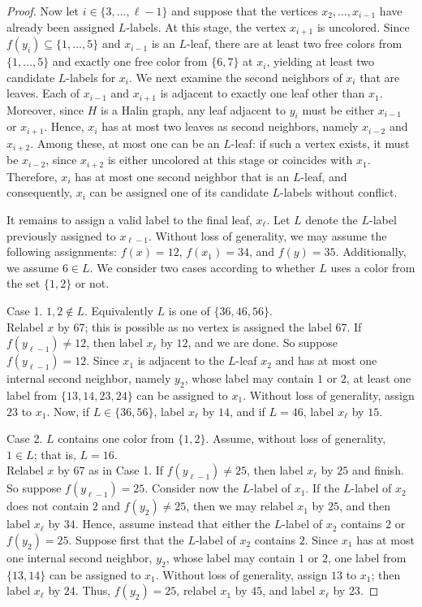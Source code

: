 \documentclass[12pt]{article}
\numberwithin{theorem}{section}
\numberwithin{conjecture}{section}
\numberwithin{corollary}{section}
\numberwithin{example}{section}
\numberwithin{lemma}{section}
\numberwithin{proposition}{section}
\numberwithin{problem}{section}
\numberwithin{remark}{section}
\numberwithin{claim}{theorem}
\numberwithin{definition}{section}
\begin{document}
\begin{proof}
\noindent Now let $i \in \{3,\dots,\ell-1\}$ and suppose that the vertices
$x_2,\dots,x_{i-1}$ have already been assigned $L$-labels. At this stage, the vertex $x_{i+1}$ is uncolored. Since $f(y_i) \subseteq \{1,\dots,5\}$ and $x_{i-1}$ is an $L$-leaf, there are at least two free colors from $\{1,\dots,5\}$ and exactly one free color from $\{6,7\}$ at $x_i$, yielding at least two candidate $L$-labels for $x_i$. We next examine the second neighbors of $x_i$ that are leaves. Each of $x_{i-1}$ and $x_{i+1}$ is adjacent to exactly one leaf other than $x_1$. Moreover, since $H$ is a Halin graph, any leaf adjacent to $y_i$ must be either $x_{i-1}$ or $x_{i+1}$. Hence, $x_i$ has at most two leaves as second neighbors, namely $x_{i-2}$ and $x_{i+2}$. Among these, at most one can be an $L$-leaf: if such a vertex exists, it must be $x_{i-2}$, since $x_{i+2}$ is either uncolored at this stage or coincides with $x_1$. Therefore, $x_i$ has at most one second neighbor that is an $L$-leaf, and consequently, $x_i$ can be assigned one of its candidate $L$-labels without conflict.

\noindent It remains to assign a valid label to the final leaf, $x_\ell$. Let $L$ denote the $L$-label previously assigned to $x_{\ell-1}$. Without loss of generality, we may assume the following assignments: $f(x) = 12$, $f(x_1) = 34$, and $f(y) = 35$. Additionally, we assume $6 \in L$. We consider two cases according to whether $L$ uses a color from the set $\{1,2\}$ or not.

\noindent Case 1. $1,2\notin L$. Equivalently $L$ is one of $\{36,46,56\}$.\\
\noindent Relabel $x$ by $67$; this is possible as no vertex is assigned the label 67. If $f(y_{\ell-1})\neq 12$, then label $x_\ell$ by $12$, and we are done. So suppose $f(y_{\ell-1})=12$. Since $x_1$ is adjacent to the $L$-leaf $x_2$ and has at most one internal second neighbor, namely $y_2$, whose label may contain $1$ or $2$, at least one label from $\{13,14,23,24\}$ can be assigned to $x_1$. Without loss of generality, assign $23$ to $x_1$. Now, if $L\in\{36,56\}$, label $x_\ell$ by $14$, and if $L=46$, label $x_\ell$ by $15$.

\noindent Case 2. $L$ contains one color from $\{1,2\}$. Assume, without loss of generality, $1\in L$; that is, $L=16$.\\
\noindent Relabel $x$ by $67$ as in Case 1. If $f(y_{\ell-1})\neq 25$, then label $x_\ell$ by $25$ and finish. So suppose $f(y_{\ell-1})=25$. Consider now the $L$-label of $x_1$. If the $L$-label of $x_2$ does not contain $2$ and $f(y_2)\neq 25$, then we may relabel $x_1$ by $25$, and then label $x_\ell$ by $34$. Hence, assume instead that either the $L$-label of $x_2$ contains $2$ or $f(y_2)=25$. Suppose first that the $L$-label of $x_2$ contains $2$. Since $x_1$ has at most one internal second neighbor, $y_2$, whose label may contain $1$ or $2$, one label from $\{13,14\}$ can be assigned to $x_1$. Without loss of generality, assign $13$ to $x_1$; then label $x_\ell$ by $24$. Thus, $f(y_2)=25$, relabel $x_1$ by $45$, and label $x_\ell$ by $23$. \end{proof}
\end{document}
